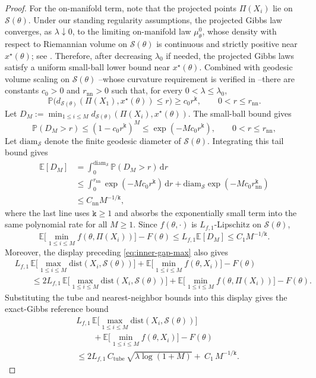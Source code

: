 \documentclass{article}
\theoremstyle{normaltheorem}
\newcommand{\gibbs}{\mu}
\newcommand{\ud}{\mathrm{d}}
\newcommand{\dimk}{\texttt{k}}
\newcommand{\calS}{\mathcal{S}}
\begin{document}
\begin{proof}
		For the on-manifold term, note that the projected points \(\Pi(X_i)\) lie on \(\calS(\theta)\). Under our standing
		regularity assumptions, the projected Gibbs law converges, as \(\lambda\downarrow0\), to the limiting on-manifold law
		\(\gibbs_\theta^0\), whose density with respect to Riemannian volume on \(\calS(\theta)\) is continuous and strictly
		positive near \(x^\star(\theta)\); see \citep[Prop.~3.7]{masiha2025superquantile}. Therefore, after decreasing
		\(\lambda_0\) if needed, the projected Gibbs laws satisfy a uniform small-ball lower bound near \(x^\star(\theta)\).
		Combined with geodesic volume scaling on \(\calS(\theta)\) \citep[Lem.~4.1]{masiha2025superquantile}--whose curvature
		requirement is verified in --there are constants \(c_0>0\) and \(r_{\mathrm{nn}}>0\)
		such that, for every \(0<\lambda\le\lambda_0\),
		\[
		\mathbb P\big(d_{\calS(\theta)}(\Pi(X_1),x^\star(\theta))\le r\big)\ge c_0 r^{\dimk},
		\qquad 0<r\le r_{\mathrm{nn}}.
		\]
	Let \(D_M:=\min_{1\le i\le M}d_{\calS(\theta)}(\Pi(X_i),x^\star(\theta))\). The small-ball bound gives
	\[
	\mathbb P(D_M>r)
	\le (1-c_0r^{\dimk})^M
	\le \exp(-Mc_0r^{\dimk}),
	\qquad 0<r\le r_{\mathrm{nn}},
	\]
		Let \(\mathrm{diam}_{\calS}\) denote the finite geodesic diameter of \(\calS(\theta)\). Integrating this tail bound gives
		\begin{align*}
		\mathbb E[D_M]
		&=\int_0^{\mathrm{diam}_{\calS}}\mathbb P(D_M>r)\,\ud r\\
		&\le \int_0^{r_{\mathrm{nn}}} \exp(-Mc_0r^{\dimk})\,\ud r
		+\mathrm{diam}_{\calS}\exp(-Mc_0r_{\mathrm{nn}}^{\dimk})\\
		&\le C_{\mathrm{nn}}M^{-1/\dimk},
		\end{align*}
		where the last line uses \(\dimk\ge1\) and absorbs the exponentially small term into the same polynomial rate for
		all \(M\ge1\).
	Since \(f(\theta,\cdot)\) is \(L_{f,1}\)-Lipschitz on \(\calS(\theta)\),
	\[
	\mathbb E\Big[\min_{1\le i\le M} f(\theta,\Pi(X_i))\Big]-F(\theta)
	\le L_{f,1}\mathbb E[D_M]
	\le C_1M^{-1/\dimk}.
	\]
	Moreover, the display preceding \eqref{eq:inner-gap-max} also gives
	\begin{align*}
	&L_{f,1}\,\mathbb E\Big[\max_{1\le i\le M}\mathrm{dist}(X_i,\calS(\theta))\Big]
	+\mathbb E\Big[\min_{1\le i\le M} f(\theta,X_i)\Big]-F(\theta)\\
	&\qquad\le
	2L_{f,1}\,\mathbb E\Big[\max_{1\le i\le M}\mathrm{dist}(X_i,\calS(\theta))\Big]
	+\mathbb E\Big[\min_{1\le i\le M} f(\theta,\Pi(X_i))\Big]-F(\theta).
	\end{align*}
	Substituting the tube and nearest-neighbor bounds into this display gives the exact-Gibbs reference bound
	\begin{equation}\label{eq:inner-gap-exact-gibbs}
	\begin{aligned}
	&L_{f,1}\,\mathbb E\Big[\max_{1\le i\le M}\mathrm{dist}(X_i,\calS(\theta))\Big]\\
	&\qquad
	+\mathbb E\Big[\min_{1\le i\le M} f(\theta,X_i)\Big]-F(\theta)\\
	&\le
	2L_{f,1}\,C_{\mathrm{tube}}\,\sqrt{\lambda\log(1+M)}
	+\ C_1\,M^{-1/\dimk}.
	\end{aligned}
	\end{equation}


\end{proof}
\end{document}
